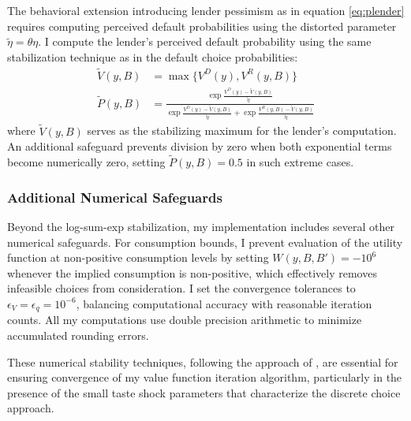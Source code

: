 \documentclass[12pt]{article}
\theoremstyle{plain}
\begin{document}
The behavioral extension introducing lender pessimism as in equation
\eqref{eq:plender} requires computing perceived default probabilities using the
distorted parameter $\tilde{\eta} = \theta \eta$. I compute the lender's
perceived default probability using the same stabilization technique as in the
default choice probabilities:
\begin{align}
	\tilde{V}(y,B) & = \max\{V^D(y), V^R(y,B)\}                                                                                                                                 \\
	\tilde{P}(y,B) & = \frac{\exp\frac{V^D(y)-\tilde{V}(y,B)}{\tilde{\eta}}}{\exp\frac{V^D(y)-\tilde{V}(y,B)}{\tilde{\eta}} + \exp\frac{V^R(y,B)-\tilde{V}(y,B)}{\tilde{\eta}}}
\end{align}
where $\tilde{V}(y,B)$ serves as the stabilizing maximum for the lender's
computation. An additional safeguard prevents division by zero when both
exponential terms become numerically zero, setting $\tilde{P}(y,B) = 0.5$ in
such extreme cases.

\subsubsection{Additional Numerical Safeguards}

Beyond the log-sum-exp stabilization, my implementation includes several other
numerical safeguards. For consumption bounds, I prevent evaluation of the
utility function at non-positive consumption levels by setting $W(y,B,B') =
	-10^6$ whenever the implied consumption is non-positive, which effectively
removes infeasible choices from consideration. I set the convergence tolerances
to $\epsilon_V = \epsilon_q = 10^{-6}$, balancing computational accuracy with
reasonable iteration counts. All my computations use double precision
arithmetic to minimize accumulated rounding errors.

These numerical stability techniques, following the approach of
\citep{MIHALACHEOREEF2024}, are essential for ensuring convergence of my value
function iteration algorithm, particularly in the presence of the small taste
shock parameters that characterize the discrete choice approach.



\end{document}
